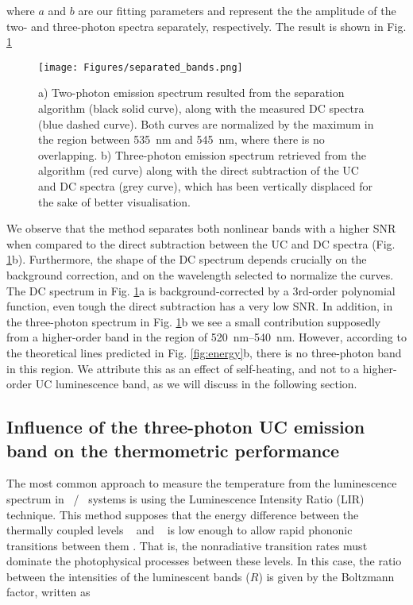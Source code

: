 \documentclass[journal=jacsat,manuscript=article, layout=twocolumn]{achemso}
\newcommand*\Yb[1]{Yb$^{3+}$}
\newcommand*\Er[1]{Er$^{3+}$}
\newcommand*\twoHeleven[1]{$^2$H$_{11/2}$}
\newcommand*\fourSthree[1]{$^4$S$_{3/2}$}
\begin{document}
\noindent where $a$ and $b$ are our fitting parameters and represent the the amplitude of the two- and three-photon spectra separately, respectively. The result is shown in Fig. \ref{fig:separated_bands}

\begin{figure}[h]
\begin{center}
\texttt{[image: Figures/separated\_bands.png]}
\caption{a) Two-photon emission spectrum resulted from the separation algorithm (black solid curve), along with the measured DC spectra (blue dashed curve). Both curves are normalized by the maximum in the region between \SI{535}{\nano\meter} and \SI{545}{\nano\meter}, where there is no overlapping. b) Three-photon emission spectrum retrieved from the algorithm (red curve) along with the direct subtraction of the UC and DC spectra (grey curve), which has been vertically displaced for the sake of better visualisation.}%
\label{fig:separated_bands}
\end{center}
\end{figure}

We observe that the method separates both nonlinear bands with a higher SNR when compared to the direct subtraction between the UC and DC spectra (Fig. \ref{fig:separated_bands}b). Furthermore, the shape of the DC spectrum depends crucially on the background correction, and on the wavelength selected to normalize the curves. The DC spectrum in Fig. \ref{fig:separated_bands}a is background-corrected by a 3rd-order polynomial function, even tough the direct subtraction has a very low SNR. In addition, in the three-photon spectrum in Fig. \ref{fig:separated_bands}b we see a small contribution supposedly from a higher-order band in the region of \SIrange{520}{540}{\nano\meter}. However, according to the theoretical lines predicted in Fig. \ref{fig:energy}b, there is no three-photon band in this region. We attribute this as an effect of self-heating, and not to a higher-order UC luminescence band, as we will discuss in the following section.

\subsection{Influence of the three-photon UC emission band on the thermometric performance}{\label{subsec:thermometry}}

The most common approach to measure the temperature from the luminescence spectrum in \Yb~/\Er~ systems is using the Luminescence Intensity Ratio (LIR) technique. This method supposes that the energy difference between the thermally coupled levels \twoHeleven~ and \fourSthree~ is low enough to allow rapid phononic transitions between them \cite{Suta_2020}. That is, the nonradiative transition rates must dominate the photophysical processes between these levels. In this case, the ratio between the intensities of the luminescent bands ($R$) is given by the Boltzmann factor, written as \cite{Suta_2020}
\end{document}
